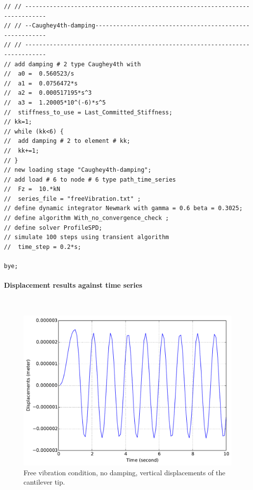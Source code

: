 \documentclass[fleqn,11pt]{article}
\begin{document}
\begin{lstlisting}
// // ----------------------------------------------------------------------------
// // --Caughey4th-damping--------------------------------------------------------
// // ----------------------------------------------------------------------------
// add damping # 2 type Caughey4th with 
//  a0 =  0.560523/s
//  a1 =  0.0756472*s
//  a2 =  0.000517195*s^3
//  a3 =  1.20005*10^(-6)*s^5
//  stiffness_to_use = Last_Committed_Stiffness;
// kk=1;
// while (kk<6) {
//  add damping # 2 to element # kk;
//  kk+=1;
// }
// new loading stage "Caughey4th-damping";
// add load # 6 to node # 6 type path_time_series 
//  Fz =  10.*kN
//  series_file = "freeVibration.txt" ;
// define dynamic integrator Newmark with gamma = 0.6 beta = 0.3025;
// define algorithm With_no_convergence_check ;
// define solver ProfileSPD;
// simulate 100 steps using transient algorithm 
//  time_step = 0.2*s;

bye;
\end{lstlisting}

\paragraph{Displacement results against time series} ~

\begin{figure}[!htb]
  \centering
  \includegraphics[width=12cm]{../Figure-files/_Chapter_Appendix_Illustrative_Examples/beam-1element-no-damping.pdf}
  \caption{Free vibration condition,  no damping, vertical displacements of the cantilever tip.}
  \label{fig_1beam_nodamping}
\end{figure}
\end{document}
